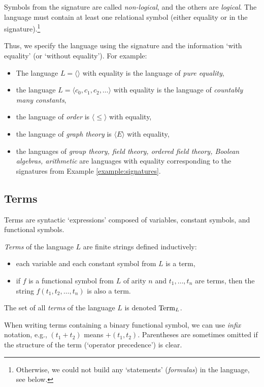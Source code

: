 Symbols from the signature are called \emph{non-logical}, and the others are \emph{logical}. The language must contain at least one relational symbol (either equality or in the signature).\footnote{Otherwise, we could not build any `statements' (\emph{formulas}) in the language, see below.}

Thus, we specify the language using the signature and the information `with equality' (or `without equality'). For example:
\begin{itemize}
    \item The language $L=\langle\rangle$ with equality is the language of \emph{pure equality},
    \item the language $L=\langle c_0,c_1,c_2,\dots\rangle$ with equality is the language of \emph{countably many constants},
    \item the language of \emph{order} is $\langle \leq \rangle$ with equality,
    \item the language of \emph{graph theory} is $\langle E \rangle$ with equality,
    \item the languages of \emph{group theory, field theory, ordered field theory, Boolean algebras, arithmetic} are languages with equality corresponding to the signatures from Example \ref{example:signatures}.
\end{itemize}


\subsection{Terms}

Terms are syntactic `expressions' composed of variables, constant symbols, and functional symbols.

\begin{definition}[Terms]
    \emph{Terms} of the language $L$ are finite strings defined inductively:
    \begin{itemize}
        \item each variable and each constant symbol from $L$ is a term,
        \item if $f$ is a functional symbol from $L$ of arity $n$ and $t_1,\dots,t_n$ are terms, then the string $f(t_1,t_2,\dots,t_n)$ is also a term.
    \end{itemize}
    The set of all \emph{terms} of the language $L$ is denoted $\operatorname{Term}_L$.
\end{definition}

When writing terms containing a binary functional symbol, we can use \emph{infix} notation, e.g., $(t_1+t_2)$ means $+(t_1,t_2)$. Parentheses are sometimes omitted if the structure of the term (`operator precedence') is clear.

